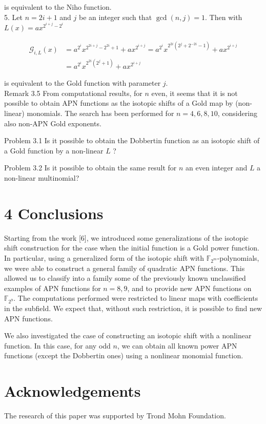 \documentclass[10pt]{article}
\begin{document}
is equivalent to the Niho function.\\
5. Let $n=2 i+1$ and $j$ be an integer such that $\operatorname{gcd}(n, j)=1$. Then with $L(x)= a x^{2^{i+j}-2^{i}}$

$$
\begin{aligned}
\mathscr{G}_{i, L}(x) & =a^{2^{i}} x^{2^{2 i+j}-2^{2 i}+1}+a x^{2^{i+j}}=a^{2^{i}} x^{2^{2 i}\left(2^{j}+2^{-2 i}-1\right)}+a x^{2^{i+j}} \\
& =a^{2^{i}} x^{2^{2 i}\left(2^{j}+1\right)}+a x^{2^{i+j}}
\end{aligned}
$$

is equivalent to the Gold function with parameter $j$.\\
Remark 3.5 From computational results, for $n$ even, it seems that it is not possible to obtain APN functions as the isotopic shifts of a Gold map by (non-linear) monomials. The search has been performed for $n=4,6,8,10$, considering also non-APN Gold exponents.

Problem 3.1 Is it possible to obtain the Dobbertin function as an isotopic shift of a Gold function by a non-linear $L$ ?

Problem 3.2 Is it possible to obtain the same result for $n$ an even integer and $L$ a non-linear multinomial?

\section*{4 Conclusions}
Starting from the work [6], we introduced some generalizations of the isotopic shift construction for the case when the initial function is a Gold power function. In particular, using a generalized form of the isotopic shift with $\mathbb{F}_{2^{m}}$-polynomials, we were able to construct a general family of quadratic APN functions. This allowed us to classify into a family some of the previously known unclassified examples of APN functions for $n=8,9$, and to provide new APN functions on $\mathbb{F}_{2^{9}}$. The computations performed were restricted to linear maps with coefficients in the subfield. We expect that, without such restriction, it is possible to find new APN functions.

We also investigated the case of constructing an isotopic shift with a nonlinear function. In this case, for any odd $n$, we can obtain all known power APN functions (except the Dobbertin ones) using a nonlinear monomial function.

\section*{Acknowledgements}
The research of this paper was supported by Trond Mohn Foundation.
\end{document}
